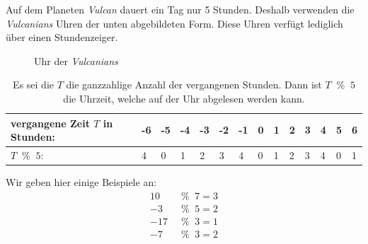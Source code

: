 \begin{myexample}\label{myexample:clock}
Auf dem Planeten \textit{Vulcan} dauert ein Tag nur 5 Stunden. Deshalb verwenden die \textit{Vulcanians} Uhren der unten abgebildeten Form. Diese Uhren verfügt lediglich über einen Stundenzeiger.
\begin{figure}[H]
	\centering
	\caption{Uhr der \textit{Vulcanians}}
\end{figure}

\begin{table}[H]
	\begin{tabular}{|l|l|l|l|l|l|l|l|l|l|l|l|l|l|}
		\hline
		{\color[HTML]{FE0000} vergangene Zeit $T$ in Stunden:} & {\color[HTML]{FE0000} -6} & {\color[HTML]{FE0000} -5} & {\color[HTML]{FE0000} -4} & {\color[HTML]{FE0000} -3} & {\color[HTML]{FE0000} -2} & {\color[HTML]{FE0000} -1} & {\color[HTML]{FE0000} 0} & {\color[HTML]{FE0000} 1} & {\color[HTML]{FE0000} 2} & {\color[HTML]{FE0000} 3} & {\color[HTML]{FE0000} 4} & {\color[HTML]{FE0000} 5} & {\color[HTML]{FE0000} 6} \\ \hline
		{\color[HTML]{3531FF} $T\; \;\%\; \; 5$:}              & {\color[HTML]{3531FF} 4}  & {\color[HTML]{3531FF} 0}  & {\color[HTML]{3531FF} 1}  & {\color[HTML]{3531FF} 2}  & {\color[HTML]{3531FF} 3}  & {\color[HTML]{3531FF} 4}  & {\color[HTML]{3531FF} 0} & {\color[HTML]{3531FF} 1} & {\color[HTML]{3531FF} 2} & {\color[HTML]{3531FF} 3} & {\color[HTML]{3531FF} 4} & {\color[HTML]{3531FF} 0} & {\color[HTML]{3531FF} 1} \\ \hline
	\end{tabular}
	\caption{Es sei die $T$ die ganzzahlige Anzahl der vergangenen Stunden. Dann ist $T\; \;\%\; \; 5$ die Uhrzeit, welche auf der Uhr abgelesen werden kann.}
\end{table}
\end{myexample}

\begin{myexample}
Wir geben hier einige Beispiele an:
\begin{align*}
	10 \; & \;\%\; \; 7 = 3 \\
	-3 \; & \;\%\; \; 5 = 2 \\
	-17\; & \;\%\; \; 3 = 1 \\
	-7 \; & \;\%\; \; 3 = 2
\end{align*}
\end{myexample}

